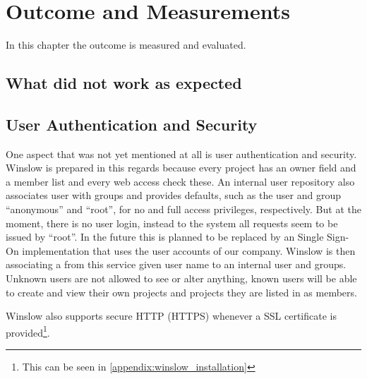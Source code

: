 \chapter{Outcome and Measurements}

In this chapter the outcome is measured and evaluated.


\section{What did not work as expected}



\section{User Authentication and Security}

One aspect that was not yet mentioned at all is user authentication and security.
Winslow is prepared in this regards because every project has an owner field and a member list and every web access check these.
An internal user repository also associates user with groups and provides defaults, such as the user and group \enquote{anonymous} and \enquote{root}, for no and full access privileges, respectively.
But at the moment, there is no user login, instead to the system all requests seem to be issued by \enquote{root}.
In the future this is planned to be replaced by an Single Sign-On implementation that uses the user accounts of our company.
Winslow is then associating a from this service given user name to an internal user and groups.
Unknown users are not allowed to see or alter anything, known users will be able to create and view their own projects and projects they are listed in as members.

Winslow also supports secure HTTP (HTTPS) whenever a SSL certificate is provided\footnote{This can be seen in \autoref{appendix:winslow_installation}}.

